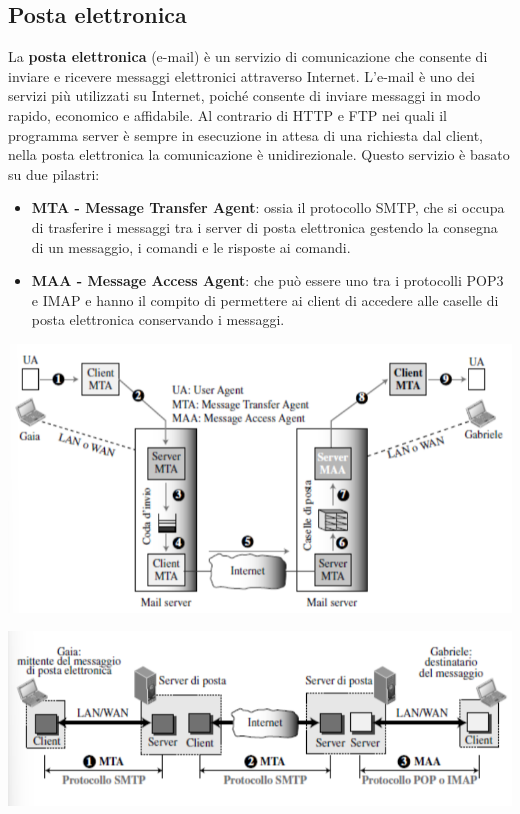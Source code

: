 \documentclass[12pt]{report}
\begin{document}
	\subsection{Posta elettronica}
	La \textbf{posta elettronica} (e-mail) è un servizio di comunicazione che consente di inviare e ricevere messaggi elettronici attraverso Internet. L'e-mail è uno dei servizi più utilizzati su Internet, poiché consente di inviare messaggi in modo rapido, economico e affidabile. Al contrario di HTTP e FTP nei quali il programma server è sempre in esecuzione in attesa di una richiesta dal client, nella posta elettronica la comunicazione è unidirezionale. Questo servizio è basato su due pilastri:
	\begin{itemize}
		\item \textbf{MTA - Message Transfer Agent}: ossia il protocollo SMTP, che si occupa di trasferire i messaggi tra i server di posta elettronica gestendo la consegna di un messaggio, i comandi e le risposte ai comandi.
		\item \textbf{MAA - Message Access Agent}: che può essere uno tra i protocolli POP3 e IMAP e hanno il compito di permettere ai client di accedere alle caselle di posta elettronica conservando i messaggi.
	\end{itemize}
	\begin{center}
		\includegraphics[scale=0.5]{assets/email.png}
	\end{center}
	\begin{center}
		\includegraphics[scale=0.5]{assets/email-comm.png}
	\end{center}
\end{document}

